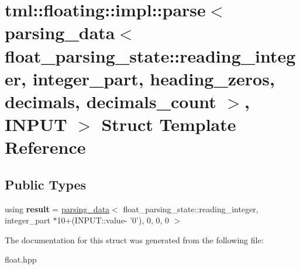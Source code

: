 \hypertarget{structtml_1_1floating_1_1impl_1_1parse_3_01parsing__data_3_01float__parsing__state_1_1reading__ide4800267e905d72b88901fca0648f5c}{\section{tml\+:\+:floating\+:\+:impl\+:\+:parse$<$ parsing\+\_\+data$<$ float\+\_\+parsing\+\_\+state\+:\+:reading\+\_\+integer, integer\+\_\+part, heading\+\_\+zeros, decimals, decimals\+\_\+count $>$, I\+N\+P\+U\+T $>$ Struct Template Reference}
\label{structtml_1_1floating_1_1impl_1_1parse_3_01parsing__data_3_01float__parsing__state_1_1reading__ide4800267e905d72b88901fca0648f5c}
}
\subsection*{Public Types}
\begin{DoxyCompactItemize}
\item 
\hypertarget{structtml_1_1floating_1_1impl_1_1parse_3_01parsing__data_3_01float__parsing__state_1_1reading__ide4800267e905d72b88901fca0648f5c_a0f85854e28b9be7318cc1f824e261f50}{using {\bfseries result} = \hyperlink{structtml_1_1floating_1_1impl_1_1parsing__data}{parsing\+\_\+data}$<$ float\+\_\+parsing\+\_\+state\+::reading\+\_\+integer, integer\+\_\+part $\ast$10+(I\+N\+P\+U\+T\+::value-\/ '0'), 0, 0, 0 $>$}\label{structtml_1_1floating_1_1impl_1_1parse_3_01parsing__data_3_01float__parsing__state_1_1reading__ide4800267e905d72b88901fca0648f5c_a0f85854e28b9be7318cc1f824e261f50}

\end{DoxyCompactItemize}


The documentation for this struct was generated from the following file\+:\begin{DoxyCompactItemize}
\item 
float.\+hpp\end{DoxyCompactItemize}
